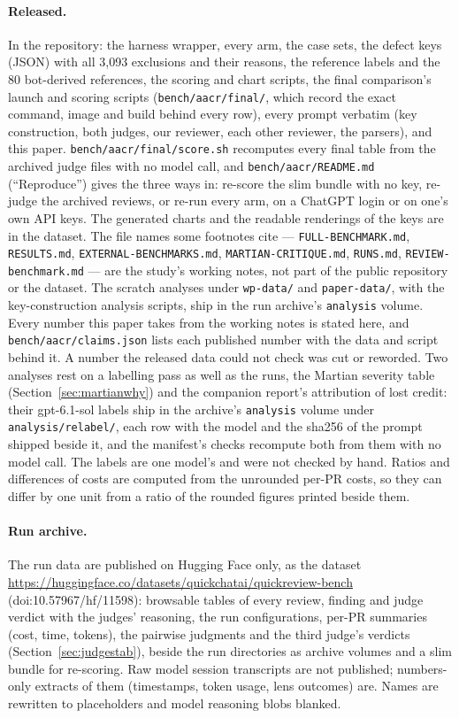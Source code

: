 \documentclass[11pt,a4paper]{article}
\newcommand{\code}[1]{\texttt{#1}}
\begin{document}
\paragraph{Released.} In the repository: the harness wrapper, every arm,
the case sets, the defect keys (JSON) with all 3{,}093 exclusions and their
reasons, the reference labels and the 80 bot-derived references, the scoring
and chart scripts, the final comparison's launch and scoring scripts
(\code{bench/aacr/final/}, which record the exact command, image and build
behind every row), every prompt verbatim (key construction, both judges, our
reviewer, each other reviewer, the parsers), and this paper.
\code{bench/aacr/final/score.sh} recomputes every final table from the
archived judge files with no model call, and \code{bench/aacr/README.md}
(``Reproduce'') gives the three ways in: re-score the slim bundle with no key,
re-judge the archived reviews, or re-run every arm, on a ChatGPT login or on
one's own API keys. The generated charts and the readable renderings of the
keys are in the dataset. The file names some footnotes cite --- \code{FULL-BENCHMARK.md}, \code{RESULTS.md}, \code{EXTERNAL-BENCHMARKS.md}, \code{MARTIAN-CRITIQUE.md}, \code{RUNS.md}, \code{REVIEW-benchmark.md} --- are the study's working notes, not part of the public repository or the dataset. The scratch analyses under \code{wp-data/} and \code{paper-data/}, with the key-construction analysis scripts, ship in the run archive's \code{analysis} volume. Every number this paper takes from the working notes is stated here, and \code{bench/aacr/claims.json} lists each published number with the data and script behind it. A number the released data could not check was cut or reworded. Two analyses rest on a labelling pass as well as the runs, the Martian severity table (Section~\ref{sec:martianwhy}) and the companion report's attribution of lost credit: their gpt-6.1-sol labels ship in the archive's \code{analysis} volume under \code{analysis/relabel/}, each row with the model and the sha256 of the prompt shipped beside it, and the manifest's checks recompute both from them with no model call. The labels are one model's and were not checked by hand. Ratios and differences of costs are computed from the unrounded per-PR costs, so they can differ by one unit from a ratio of the rounded figures printed beside them.

\paragraph{Run archive.} The run data are published on Hugging Face only,
as the dataset \url{https://huggingface.co/datasets/quickchatai/quickreview-bench}
(doi:10.57967/hf/11598): browsable tables of every review, finding
and judge verdict with the judges' reasoning, the run configurations, per-PR
summaries (cost, time, tokens), the pairwise judgments and the third judge's
verdicts (Section~\ref{sec:judgestab}), beside the run
directories as archive volumes and a slim bundle for re-scoring. Raw model
session transcripts are not published; numbers-only extracts of them
(timestamps, token usage, lens outcomes) are. Names are rewritten to
placeholders and model reasoning blobs blanked.
\end{document}
